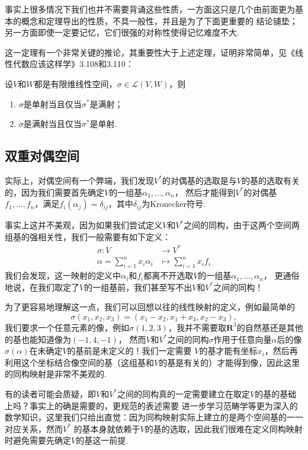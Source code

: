 \begin{enumerate}
    事实上很多情况下我们也并不需要背诵这些性质，一方面这只是几个由前面更为基本的概念和定理导出的性质，不具一般性，并且是为了下面更重要的
    结论铺垫；另一方面即使一定要记忆，它们很强的对称性使得记忆难度不大.
    
    这一定理有一个非常关键的推论，其重要性大于上述定理，证明非常简单，见《线性代数应该这样学》3.108和3.110：
    \begin{corollary}\label{cor:9:对偶映射单满射}
        设$V$和$W$都是有限维线性空间，$\sigma\in\mathcal{L}(V,W)$，则
        \begin{enumerate}
            \item $\sigma$是单射当且仅当$\sigma^*$是满射；
            \item $\sigma$是满射当且仅当$\sigma^*$是单射.
        \end{enumerate}
    \end{corollary}
\end{enumerate}

\subsection{双重对偶空间}
实际上，对偶空间有一个弊端，我们发现$V^*$的对偶基的选取是与$V$的基的选取有关的，因为我们需要首先确定$V$的一组基$\alpha_1,\ldots,\alpha_n$，
然后才能得到$V^*$的对偶基$f_1,\ldots,f_n$，满足$f_i(\alpha_j)=\delta_{ij}$，其中$\delta_{ij}$为Kronecker符号.

事实上这并不美观，因为如果我们尝试定义$V$和$V^*$之间的同构，由于这两个空间两组基的强相关性，我们一般需要有如下定义：
\begin{align*}
    \sigma:V&\to V^* \\
    \alpha=\sum_{i=1}^nx_i\alpha_i&\mapsto\sum_{i=1}^nx_if_i
\end{align*}
我们会发现，这一映射的定义中$\alpha_i$和$f_i$都离不开选取$V$的一组基$\alpha_1,\ldots,\alpha_n$，
更通俗地说，在我们取定了$V$的一组基前，我们甚至写不出$V$和$V^*$之间的同构！

为了更容易地理解这一点，我们可以回想以往的线性映射的定义，例如最简单的
\[\sigma(x_1,x_2,x_3)=(x_1-x_2,x_1+x_3,x_2-x_3),\]
我们要求一个任意元素的像，例如$\sigma(1,2,3)$，我并不需要取$\mathbf{R}^3$的自然基还是其他的基也能知道像为$(-1,4,-1)$，
然而$V$和$V^*$之间的同构$\sigma$作用于任意向量$\alpha$后的像$\sigma(\alpha)$在未确定$V$的基前是未定义的！我们一定需要
$V$的基才能有坐标$x_i$，然后再利用这个坐标结合像空间的基（这组基和$V$的基是有关的）才能得到像，因此这里的同构映射是非常不美观的.

有的读者可能会质疑，即$V$和$V^*$之间的同构真的一定需要建立在取定$V$的基的基础上吗？事实上的确是需要的，更规范的表述需要
进一步学习范畴学等更为深入的数学知识，这里我们只给出直觉：因为同构映射实际上建立的是两个空间基的一一对应关系，然而$V^*$
的基本身就依赖于$V$的基的选取，因此我们很难在定义同构映射时避免需要先确定$V$的基这一前提.

